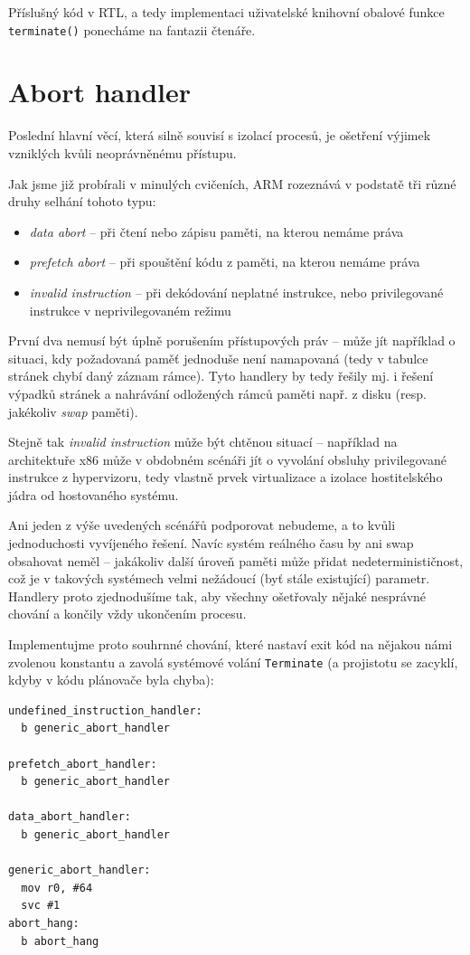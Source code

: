 \documentclass{article}
\begin{document}
Příslušný kód v RTL, a tedy implementaci uživatelské knihovní obalové funkce {\tt terminate()} ponecháme na fantazii čtenáře.

\section{Abort handler}

Poslední hlavní věcí, která silně souvisí s izolací procesů, je ošetření výjimek vzniklých kvůli neoprávněnému přístupu.

Jak jsme již probírali v minulých cvičeních, ARM rozeznává v podstatě tři různé druhy selhání tohoto typu:
\begin{itemize}
	\item \emph{data abort} -- při čtení nebo zápisu paměti, na kterou nemáme práva
	\item \emph{prefetch abort} -- při spouštění kódu z paměti, na kterou nemáme práva
	\item \emph{invalid instruction} -- při dekódování neplatné instrukce, nebo privilegované instrukce v neprivilegovaném režimu
\end{itemize}

První dva nemusí být úplně porušením přístupových práv -- může jít například o situaci, kdy požadovaná paměť jednoduše není namapovaná (tedy v tabulce stránek chybí daný záznam rámce). Tyto handlery by tedy řešily mj. i řešení výpadků stránek a nahrávání odložených rámců paměti např. z disku (resp. jakékoliv \emph{swap} paměti).

Stejně tak \emph{invalid instruction} může být chtěnou situací -- například na architektuře x86 může v obdobném scénáři jít o vyvolání obsluhy privilegované instrukce z hypervizoru, tedy vlastně prvek virtualizace a izolace hostitelského jádra od hostovaného systému.

Ani jeden z výše uvedených scénářů podporovat nebudeme, a to kvůli jednoduchosti vyvíjeného řešení. Navíc systém reálného času by ani swap obsahovat neměl -- jakákoliv další úroveň paměti může přidat nedeterminističnost, což je v takových systémech velmi nežádoucí (byť stále existující) parametr. Handlery proto zjednodušíme tak, aby všechny ošetřovaly nějaké nesprávné chování a končily vždy ukončením procesu.

Implementujme proto souhrnné chování, které nastaví exit kód na nějakou námi zvolenou konstantu a zavolá systémové volání {\tt Terminate} (a projistotu se zacyklí, kdyby v kódu plánovače byla chyba):
\begin{lstlisting}[language={[ARM]Assembler}]
undefined_instruction_handler:
  b generic_abort_handler

prefetch_abort_handler:
  b generic_abort_handler

data_abort_handler:
  b generic_abort_handler

generic_abort_handler:
  mov r0, #64
  svc #1
abort_hang:
  b abort_hang
\end{lstlisting}
\end{document}
